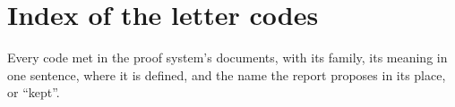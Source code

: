 \chapter{Index of the letter codes}\label{ch:codeindex}

Every code met in the proof system's documents, with its family, its meaning in one sentence,
where it is defined, and the name the report proposes in its place, or \enquote{kept}.
